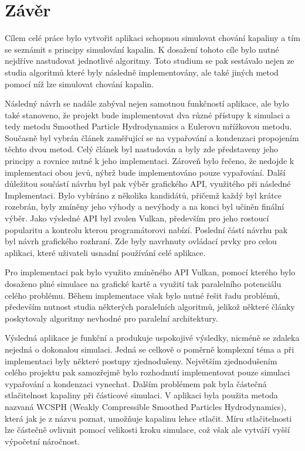 \chapter{Závěr}
\label{chapter:zaver}

Cílem celé práce bylo vytvořit aplikaci schopnou simulovat chování kapaliny a tím se seznámit s principy simulování kapalin. K dosažení tohoto cíle bylo nutné nejdříve nastudovat jednotlivé algoritmy. Toto studium se pak sestávalo nejen ze studia algoritmů které byly následně implementovány, ale také jiných metod pomocí níž lze simulovat chování kapalin.

Následný návrh se nadále zabýval nejen samotnou funkčností aplikace, ale bylo také stanoveno, že projekt bude implementovat dva různé přístupy k simulaci a tedy metodu Smoothed Particle Hydrodynamics a Eulerovu mřížkovou metodu. Současně byl vybrán článek \cite{Evap&Cond} zaměřující se na vypařování a kondenzaci propojením těchto dvou metod. Celý článek byl nastudován a byly zde představeny jeho principy a rovnice nutné k jeho implementaci. Zároveň bylo řečeno, že nedojde k implementaci obou jevů, nýbrž bude implementováno pouze vypařování. Další důležitou součástí návrhu byl pak výběr grafického API, využitého při následné Implementaci. Bylo vybíráno z několika kandidátů, přičemž každý byl krátce rozebrán, byly zmíněny jeho výhody a nevýhody a na konci byl učiněn finální výběr. Jako výsledné API byl zvolen Vulkan, především pro jeho rostoucí popularitu a kontrolu kterou programátorovi nabízí. Poslední částí návrhu pak byl návrh grafického rozhraní. Zde byly navrhnuty ovládací prvky pro celou aplikaci, které uživateli usnadní používání celé aplikace.

Pro implementaci pak bylo využito zmíněného API Vulkan, pomocí kterého bylo dosaženo plné simulace na grafické kartě a využití tak paralelního potenciálu celého problému. Během implementace však bylo nutné řešit řadu problémů, především nutnost studia některých paralelních algoritmů, jelikož některé články poskytovaly algoritmy nevhodné pro paralelní architektury.

Výsledná aplikace je funkční a produkuje uspokojivé výsledky, nicméně se zdaleka nejedná o dokonalou simulaci. Jedná se celkově o poměrně komplexní téma a při implementaci byly některé postupy zjednodušeny. Největším zjednodušením celého projektu pak samozřejmě bylo rozhodnutí implementovat pouze simulaci vypařování a kondenzaci vynechat. Dalším problémem pak byla částečná stlačitelnost kapaliny při částicové simulaci. V aplikaci byla použita metoda nazvaná WCSPH (Weakly Compressible Smoothed Particles Hydrodynamics), která jak je z názvu poznat, umožňuje kapalinu lehce stlačit. Míru stlačitelnosti lze částečně ovlivnit pomocí velikosti kroku simulace, což však ale vytváří vyšší výpočetní náročnost. 

